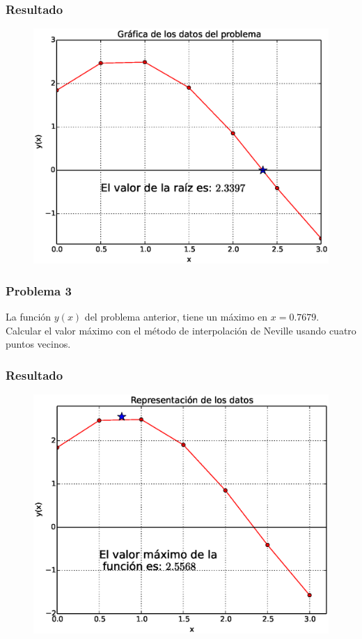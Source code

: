 \begin{frame}
\frametitle{Resultado}
\begin{figure}
	\centering
	\includegraphics[scale=0.5]{Imagenes/Problema2_01.eps} 
\end{figure}
\end{frame}
\begin{frame}
\frametitle{Problema 3}
La función $y(x)$ del problema anterior, tiene un máximo en $x=0.7679$. Calcular el valor máximo con el método de interpolación de Neville usando cuatro puntos vecinos.
\\
\bigskip
{}
\end{frame}
\begin{frame}
\frametitle{Resultado}
\begin{figure}
	\centering
	\includegraphics[scale=0.5]{Imagenes/Problema3_01.eps} 
\end{figure}
\end{frame}
